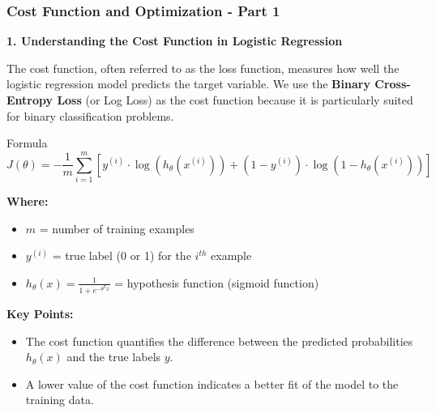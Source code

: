 \documentclass[aspectratio=169]{beamer}
\begin{document}
\begin{frame}[fragile]
    \frametitle{Cost Function and Optimization - Part 1}

    \textbf{1. Understanding the Cost Function in Logistic Regression}
    
    The cost function, often referred to as the loss function, measures how well the logistic regression model predicts the target variable.
    We use the \textbf{Binary Cross-Entropy Loss} (or Log Loss) as the cost function because it is particularly suited for binary classification problems.
    
    \begin{block}{Formula}
        \begin{equation}
        J(\theta) = -\frac{1}{m} \sum_{i=1}^{m} [y^{(i)} \cdot \log(h_\theta(x^{(i)})) + (1 - y^{(i)}) \cdot \log(1 - h_\theta(x^{(i)}))]
        \end{equation}
    \end{block}
    
    \textbf{Where:}
    \begin{itemize}
        \item $m$ = number of training examples
        \item $y^{(i)}$ = true label (0 or 1) for the $i^{th}$ example
        \item $h_\theta(x) = \frac{1}{1 + e^{-\theta^Tx}}$ = hypothesis function (sigmoid function)
    \end{itemize}
    
    \textbf{Key Points:}
    \begin{itemize}
        \item The cost function quantifies the difference between the predicted probabilities $h_\theta(x)$ and the true labels $y$.
        \item A lower value of the cost function indicates a better fit of the model to the training data.
    \end{itemize}
\end{frame}
\end{document}
